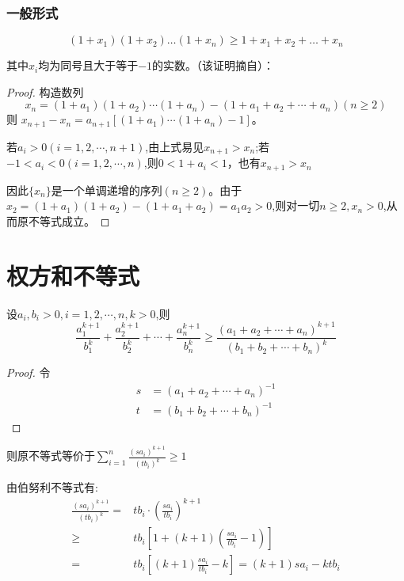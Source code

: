 \documentclass[a4paper]{article} %
\numberwithin{equation}{section} %
\begin{document}
\subsubsection{一般形式}

\begin{equation}
(1+x_1)(1+x_2)\ldots(1+x_n)\ge 1+x_1+x_2+\ldots + x_n
\end{equation}

其中$x_i$均为同号且大于等于$-1$的实数。（该证明摘自\cite{ineq}）：

\begin{proof}
构造数列
$$
x_n=(1+a_1)(1+a_2)\cdots(1+a_n)-(1+a_1+a_2+\cdots+a_n)(n\ge 2)
$$ 则
$x_{n+1}-x_n=a_{n+1}[(1+a_1)\cdots(1+a_n)-1]$。

若$a_i>0(i=1,2,\cdots,n+1)$,由上式易见$x_{n+1}> x_n$;若$-1< a_i< 0(i=1,2,\cdots,n)$,则$0< 1+a_i< 1$，也有$x_{n+1}>x_n$

因此$\{x_n\}$是一个单调递增的序列$(n\ge 2)$。由于$x_2=(1+a_1)(1+a_2)-(1+a_1+a_2)=a_1a_2>0$,则对一切$n\ge 2,x_n> 0$,从而原不等式成立。
\end{proof}

\section{权方和不等式}

设$a_i,b_i> 0,i=1,2,\cdots,n,k>0$,则
\begin{equation}
\frac{a_1^{k+1}}{b_1^k}+\frac{a_2^{k+1}}{b_2^k}+\cdots+\frac{a_n^{k+1}}{b_n^k}\ge \frac{(a_1+a_2+\cdots+a_n)^{k+1}}{(b_1+b_2+\cdots+b_n)^k}
\end{equation}

\begin{proof}
令
\begin{align}
s &=(a_1+a_2+\cdots+a_n)^{-1} \\
t &=(b_1+b_2+\cdots+b_n)^{-1} 
\end{align}
\end{proof}

则原不等式等价于$\displaystyle \sum_{i=1}^n\frac{(sa_i)^{k+1}}{(tb_i)^k}\ge 1$

由伯努利不等式有:
\begin{align}
\frac{(sa_i)^{k+1}}{(tb_i)^k} 
=& tb_i\cdot\left(\frac{sa_i}{tb_i}\right)^{k+1} \\
\ge & tb_i\left[1+(k+1)(\frac{sa_i}{tb_i}-1)\right] \\
=& tb_i\left[(k+1)\frac{sa_i}{tb_i}-k\right]=(k+1)sa_i-ktb_i
\end{align}
\end{document}
